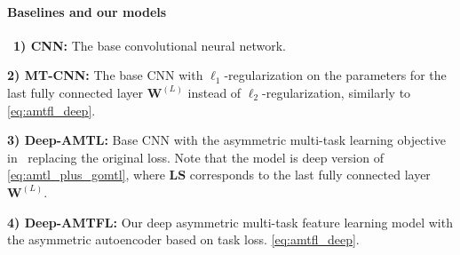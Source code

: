 \documentclass{article}
\newcommand{\mat}[1]{\boldsymbol{#1}} %
\begin{document}
	\paragraph{Baselines and our models}
	\vspace{-0.05in}
	\ \newline\newline \noindent \textbf{1) CNN:} The base convolutional neural network.
	
	\noindent \textbf{2) MT-CNN:} The base CNN with $\ell_1$-regularization on the parameters for the last fully connected layer $\mat{W}^{(L)}$ instead of $\ell_2$-regularization, similarly to \eqref{eq:amtfl_deep}. %
	
	\noindent \textbf{3) Deep-AMTL:} Base CNN with the asymmetric multi-task learning objective in~\cite{amtl} replacing the original loss. Note that the model is deep version of \eqref{eq:amtl_plus_gomtl}, where $\mat{LS}$ corresponds to the last fully connected layer $\mat{W}^{(L)}$.
	
	
	\noindent \textbf{4) Deep-AMTFL:} Our deep asymmetric multi-task feature learning model with the asymmetric autoencoder based on task loss. \eqref{eq:amtfl_deep}.
	
\end{document}
